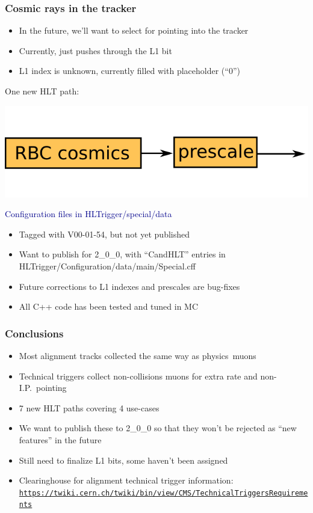 \documentclass[compress]{beamer}
\begin{document}
\begin{frame}
\frametitle{Cosmic rays in the tracker}

\begin{itemize}
\item In the future, we'll want to select for pointing into the tracker
\item Currently, just pushes through the L1 bit
\item L1 index is unknown, currently filled with placeholder (``0'')
\end{itemize}

\vfill
One new HLT path:

\vspace{-0.5 cm}
\begin{center}
\includegraphics[height=1.3 cm]{path_tracker_cosmics.png}
\end{center}

\vfill
\hspace{-0.83 cm} \textcolor{darkblue}{\Large Configuration files in HLTrigger/special/data}

\vspace{0.1 cm}
\begin{itemize}\setlength{\itemsep}{0.2 cm}
\item Tagged with V00-01-54, but not yet published
\item Want to publish for 2\_0\_0, with ``CandHLT'' entries in HLTrigger/Configuration/data/main/Special.cff
\item Future corrections to L1 indexes and prescales are bug-fixes
\item All C++ code has been tested and tuned in MC
\end{itemize}

\end{frame}

\begin{frame}
\frametitle{Conclusions}
\begin{itemize}\setlength{\itemsep}{0.4 cm}
\item Most alignment tracks collected the same way as \mbox{physics muons\hspace{-1 cm}}
\item Technical triggers collect non-collisions muons for extra rate and non-I.P.\ pointing
\item 7 new HLT paths covering 4 use-cases
\item We want to publish these to 2\_0\_0 so that they won't be
rejected as ``new features'' in the future
\item Still need to finalize L1 bits, some haven't been assigned
\item Clearinghouse for alignment technical trigger information:
{\tt \scriptsize \textcolor{blue}{\mbox{\url{https://twiki.cern.ch/twiki/bin/view/CMS/TechnicalTriggersRequirements}}}}
\end{itemize}
\label{numpages}
\end{frame}
\end{document}
